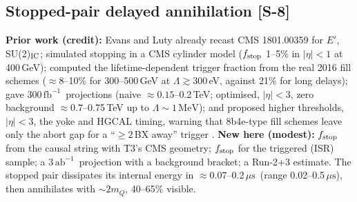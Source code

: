 \documentclass[11pt,a4paper]{article}
\newcommand{\mQ}{m_Q}
\newcommand{\MeV}{\ensuremath{\,\mathrm{MeV}}}
\newcommand{\fbinv}{\ensuremath{\,\mathrm{fb}^{-1}}}
\newcommand{\abinv}{\ensuremath{\,\mathrm{ab}^{-1}}}
\newcommand{\mus}{\ensuremath{\,\mu\mathrm{s}}}
\newcommand{\src}[1]{{\color{mid}[#1]}}
\begin{document}
\subsection{Stopped-pair delayed annihilation \src{S-8}}\label{sec:stopped}
\textbf{Prior work (credit):} Evans and Luty already recast CMS 1801.00359 for $E'$, SU(2)$_{\rm IC}$; simulated stopping in a CMS cylinder model ($f_{\rm stop}$ 1--5\% in $|\eta|<1$ at 400\,GeV); computed the lifetime-dependent trigger fraction from the real 2016 fill schemes ($\approx8$--10\% for 300--500\,GeV at $\Lambda\gtrsim300$\,eV, against 21\% for long delays); gave 300\fbinv\ projections (naive $\approx0.15$--0.2\,TeV; optimised, $|\eta|<3$, zero background $\approx0.7$--0.75\,TeV up to $\Lambda\sim1\MeV$); and proposed higher thresholds, $|\eta|<3$, the yoke and HGCAL timing, warning that 8b4e-type fill schemes leave only the abort gap for a ``$\ge2$\,BX away'' trigger \cite{EvansLuty}. \textbf{New here (modest):} $f_{\rm stop}$ from the causal string with T3's CMS geometry; $f_{\rm stop}$ for the triggered (ISR) sample; a 3\abinv\ projection with a background bracket; a Run-2+3 estimate. The stopped pair dissipates its internal energy in $\approx0.07$--0.2\mus\ (range 0.02--0.5\mus), then annihilates with $\sim2\mQ$, 40--65\% visible.
\end{document}
